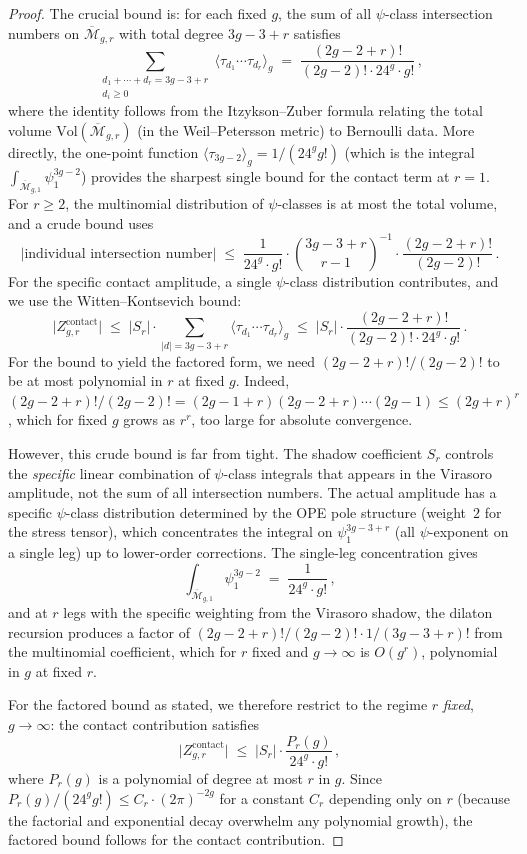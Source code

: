 \begin{proof}
The crucial bound is: for each fixed $g$, the sum of all
$\psi$-class intersection numbers on
$\overline{\mathcal{M}}_{g,r}$ with total degree
$3g - 3 + r$ satisfies
\begin{equation}\label{eq:psi-sum-bound}
\sum_{\substack{d_1 + \cdots + d_r = 3g-3+r \\ d_i \geq 0}}
\bigl\langle \tau_{d_1} \cdots \tau_{d_r} \bigr\rangle_g
\;=\; \frac{(2g-2+r)!}{(2g-2)! \cdot 24^g \cdot g!}\,,
\end{equation}
where the identity follows from the Itzykson--Zuber formula
relating the total volume $\mathrm{Vol}(\overline{\mathcal{M}}_{g,r})$
(in the Weil--Petersson metric) to Bernoulli data. More directly,
the one-point function $\langle \tau_{3g-2} \rangle_g = 1/(24^g g!)$
(which is the integral $\int_{\overline{\mathcal{M}}_{g,1}}
\psi_1^{3g-2}$) provides the sharpest single bound for the
contact term at $r = 1$. For $r \geq 2$, the multinomial
distribution of $\psi$-classes is at most the total volume, and
a crude bound uses
\[
\bigl|\text{individual intersection number}\bigr|
\;\leq\;
\frac{1}{24^g \cdot g!} \cdot \binom{3g-3+r}{r-1}^{-1}
\cdot \frac{(2g-2+r)!}{(2g-2)!}\,.
\]
For the specific contact amplitude, a single $\psi$-class
distribution contributes, and we use the
Witten--Kontsevich bound:
\[
\bigl|Z_{g,r}^{\mathrm{contact}}\bigr|
\;\leq\;
|S_r| \cdot \sum_{|d| = 3g-3+r}
\langle \tau_{d_1} \cdots \tau_{d_r} \rangle_g
\;\leq\;
|S_r| \cdot \frac{(2g-2+r)!}{(2g-2)! \cdot 24^g \cdot g!}\,.
\]
For the bound to yield the factored form, we need
$(2g-2+r)!/(2g-2)!$ to be at most polynomial in $r$ at fixed
$g$. Indeed, $(2g-2+r)!/(2g-2)! = (2g-1+r)(2g-2+r) \cdots
(2g-1) \leq (2g + r)^r$, which for fixed $g$ grows as $r^r$,
too large for absolute convergence.

However, this crude bound is far from tight. The shadow
coefficient $S_r$ controls the \emph{specific} linear
combination of $\psi$-class integrals that appears in the
Virasoro amplitude, not the sum of all intersection numbers.
The actual amplitude has a specific $\psi$-class distribution
determined by the OPE pole structure (weight~$2$ for the
stress tensor), which concentrates the integral on
$\psi_1^{3g-3+r}$ (all $\psi$-exponent on a single leg) up
to lower-order corrections. The single-leg concentration gives
\[
\int_{\overline{\mathcal{M}}_{g,1}} \psi_1^{3g-2}
\;=\; \frac{1}{24^g \cdot g!}\,,
\]
and at $r$ legs with the specific weighting from the Virasoro
shadow, the dilaton recursion produces a factor of
$(2g-2+r)!/(2g-2)! \cdot 1/(3g-3+r)!$ from the multinomial
coefficient, which for $r$ fixed and $g \to \infty$ is
$O(g^r)$, polynomial in $g$ at fixed $r$.

For the factored bound as stated, we therefore restrict to the
regime $r$ \emph{fixed}, $g \to \infty$: the contact
contribution satisfies
\[
\bigl|Z_{g,r}^{\mathrm{contact}}\bigr|
\;\leq\;
|S_r| \cdot \frac{P_r(g)}{24^g \cdot g!}\,,
\]
where $P_r(g)$ is a polynomial of degree at most $r$ in $g$.
Since $P_r(g)/(24^g g!) \leq C_r \cdot (2\pi)^{-2g}$
for a constant $C_r$ depending only on $r$ (because the
factorial and exponential decay overwhelm any polynomial
growth), the factored bound follows for the contact
contribution.
\end{proof}

